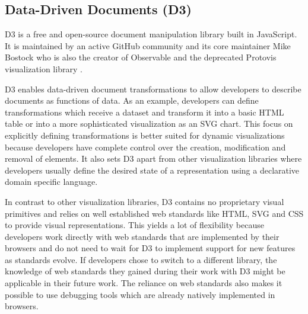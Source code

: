 \subsection{Data-Driven Documents (D3)}

D3 \parencite{D3} is a free and open-source document manipulation library built in JavaScript.
It is maintained by an active GitHub community and its core maintainer Mike Bostock who is also the creator of Observable \parencite{Observable} and the deprecated Protovis visualization library \parencite{Protovis}.

D3 enables data-driven document transformations to allow developers to describe documents as functions of data.
As an example, developers can define transformations which receive a dataset and transform it into a basic HTML table or into a more sophisticated visualization as an SVG chart.
This focus on explicitly defining transformations is better suited for dynamic visualizations because developers have complete control over the creation, modification and removal of elements.
It also sets D3 apart from other visualization libraries where developers usually define the desired state of a representation using a declarative domain specific language.

In contrast to other visualization libraries, D3 contains no proprietary visual primitives and relies on well established web standards like HTML, SVG and CSS to provide visual representations.
This yields a lot of flexibility because developers work directly with web standards that are implemented by their browsers and do not need to wait for D3 to implement support for new features as standards evolve.
If developers chose to switch to a different library, the knowledge of web standards they gained during their work with D3 might be applicable in their future work.
The reliance on web standards also makes it possible to use debugging tools which are already natively implemented in browsers.

